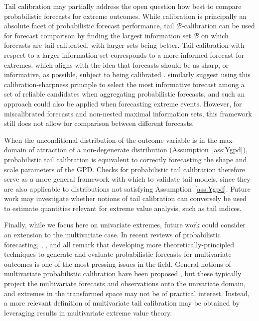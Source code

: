 \documentclass[12pt]{article}
\newcommand{\Bb}{\mathcal{B}}
\newcommand{\1}{\mathbf{1}} %
\theoremstyle{definition}
\begin{document}
Tail calibration may partially address the open question how best to compare probabilistic forecasts for extreme outcomes. While calibration is principally an absolute facet of probabilistic forecast performance, tail $\Bb$-calibration can be used for forecast comparison by finding the largest information set $\Bb$ on which forecasts are tail calibrated, with larger sets being better. Tail calibration with respect to a larger information set corresponds to a more informed forecast for extremes, which aligns with the idea that forecasts should be as sharp, or informative, as possible, subject to being calibrated \citep{GneitingEtAl2007}. \cite{zamo2021sequential} similarly suggest using this calibration-sharpness principle to select the most informative forecast among a set of reliable candidates when aggregating probabilistic forecasts, and such an approach could also be applied when forecasting extreme events. However, for miscalibrated forecasts and non-nested maximal information sets, this framework still does not allow for comparison between different forecasts.

When the unconditional distribution of the outcome variable is in the max-domain of attraction of a non-degenerate distribution (Assumption~\ref{ass:Ygpd}), probabilistic tail calibration is equivalent to correctly forecasting the shape and scale parameters of the GPD. Checks for probabilistic tail calibration therefore serve as a more general framework with which to validate tail models, since they are also applicable to distributions not satisfying Assumption~\ref{ass:Ygpd}. Future work may investigate whether notions of tail calibration can conversely be used to estimate quantities relevant for extreme value analysis, such as tail indices.

Finally, while we focus here on univariate extremes, future work could consider an extension to the multivariate case. In recent reviews of probabilistic forecasting, \citet{GneitingKatzfuss2014}, \citet{KneibEtAl2023}, and \citet{PetropoulosEtAl2022} all remark that developing more theoretically-principled techniques to generate and evaluate probabilistic forecasts for multivariate outcomes is one of the most pressing issues in the field. 
General notions of multivariate probabilistic calibration have been proposed \citep[e.g.][]{GneitingEtAl2008,AllenEtAl2023c}, but these typically project the multivariate forecasts and observations onto the univariate domain, and extremes in the transformed space may not be of practical interest. Instead, a more relevant definition of multivariate tail calibration may be obtained by leveraging results in multivariate extreme value theory.
\end{document}
